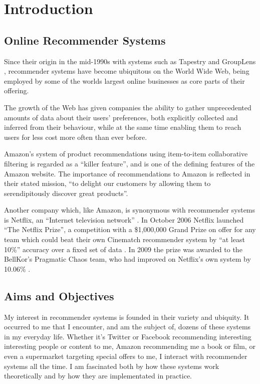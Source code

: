 \iffalse 
Chapter 1: Introduction - the topic, the background, why the topic is relevant or of interest to you, what you hoped to achieve, the aims and objectives of the project.  
\fi

\section{Introduction}

\subsection{Online Recommender Systems}

Since their origin in the mid-1990s with systems such as Tapestry \cite{Goldberg92} and GroupLens \cite{Resnick94}, recommender systems have become ubiquitous on the World Wide Web, being employed by some of the worlds largest online businesses as core parts of their offering.

The growth of the Web has given companies the ability to gather unprecedented amounts of data about their users' preferences, both explicitly collected and inferred from their behaviour, while at the same time enabling them to reach users for less cost more often than ever before.

Amazon's system of product recommendations using item-to-item collaborative filtering is regarded as a ``killer feature''\cite{Fortune12}, and is one of the defining features of the Amazon website. The importance of recommendations to Amazon is reflected in their stated mission, ``to delight our customers by allowing them to serendipitously discover great products''\cite{Fortune12}.

Another company which, like Amazon, is synonymous with recommender systems is Netflix, an ``Internet television network'' \cite{NetflixAbout}. In October 2006 Netflix launched ``The Netflix Prize'', a competition with a \$1,000,000 Grand Prize on offer for any team which could beat their own Cinematch recommender system by ``at least 10\%'' accuracy over a fixed set of data \cite{NetflixPrizeRules}. In 2009 the prize was awarded to the BellKor's Pragmatic Chaos team, who had improved on Netflix's own system by 10.06\% \cite{NetflixPrizeCom}. 

\subsection{Aims and Objectives}

My interest in recommender systems is founded in their variety and ubiquity. It occurred to me that I encounter, and am the subject of, dozens of these systems in my everyday life. Whether it's Twitter or Facebook recommending interesting interesting people or content to me, Amazon recommending me a book or film, or even a supermarket targeting special offers to me, I interact with recommender systems all the time. I am fascinated both by how these systems work theoretically and by how they are implementated in practice.

